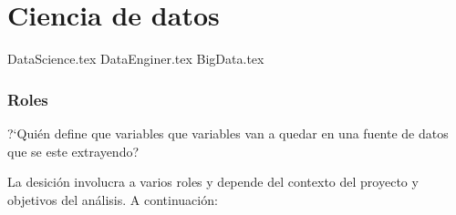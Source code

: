 
\part{Ciencia de datos}
{DataScience.tex}
{DataEnginer.tex}
{BigData.tex}




\section{Roles}

?`Qui\'en define que variables que variables van a quedar en una fuente de datos que se este 
extrayendo?

La desici\'on involucra a varios roles y depende del contexto del proyecto y objetivos del an\'alisis. 
A continuaci\'on: 


